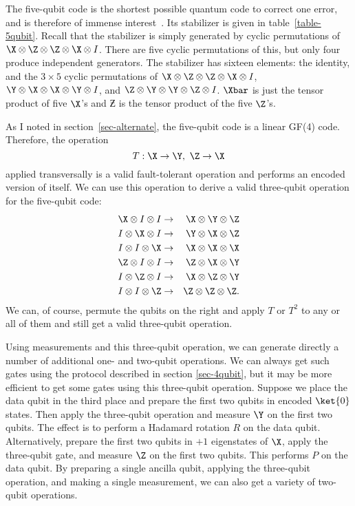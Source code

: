 The five-qubit code is the shortest possible quantum code to correct one
error, and is therefore of immense interest~\cite{bennett-tome,
	laflamme-5qubit}.  Its stabilizer is given in table~\ref{table-5qubit}.  Recall
that the stabilizer is simply generated by cyclic permutations of $\X
\otimes \Z \otimes \Z \otimes \X \otimes I$.  There are five cyclic
permutations of this, but only four produce independent generators.  The
stabilizer has sixteen elements: the identity, and the $3 \times 5$ cyclic
permutations of $\X \otimes \Z \otimes \Z \otimes \X \otimes I$, $\Y
\otimes \X \otimes \X \otimes \Y \otimes I$, and $\Z \otimes \Y \otimes
\Y \otimes \Z \otimes I$.  $\Xbar$ is just the tensor product of five $\X$'s
and $\Zbar$ is the tensor product of the five $\Z$'s.

As I noted in section~\ref{sec-alternate}, the five-qubit code is a linear
GF(4) code.  Therefore, the operation
\begin{equation}
	T: \X \rightarrow \Y, \ \Z \rightarrow \X
\end{equation}
applied transversally is a valid fault-tolerant operation and performs an
encoded version of itself.  We can use this operation to derive a valid
three-qubit operation for the five-qubit code:
\begin{eqnarray}
	\X \otimes I \otimes I & \rightarrow & \X \otimes \Y \otimes \Z
	\nonumber \\
	I \otimes \X \otimes I & \rightarrow & \Y \otimes \X \otimes \Z
	\nonumber \\
	I \otimes I \otimes \X & \rightarrow & \X \otimes \X \otimes \X \\
	\Z \otimes I \otimes I & \rightarrow & \Z \otimes \X \otimes \Y \nonumber
	\\
	I \otimes \Z \otimes I & \rightarrow & \X \otimes \Z \otimes \Y \nonumber
	\\
	I \otimes I \otimes \Z & \rightarrow & \Z \otimes \Z \otimes \Z. \nonumber
\end{eqnarray}
We can, of course, permute the qubits on the right and apply $T$ or $T^2$
to any or all of them and still get a valid three-qubit operation.

Using measurements and this three-qubit operation, we can generate
directly a number of additional one- and two-qubit operations.  We can
always get such gates using the protocol described in section \ref{sec-4qubit},
but it may be more efficient to get some gates using this three-qubit
operation.  Suppose we place the data qubit in the third place and prepare
the first two qubits in encoded $\ket{0}$ states.  Then apply the
three-qubit operation and measure $\Y$ on the first two qubits.  The effect is
to perform a Hadamard rotation $R$ on the data qubit.  Alternatively, prepare
the first two qubits in $+1$ eigenstates of $\X$, apply the three-qubit gate,
and measure $\Z$ on the first two qubits.  This performs $P$ on the data qubit.
By preparing a single ancilla qubit, applying the three-qubit operation, and
making a single measurement, we can also get a variety of two-qubit operations.

